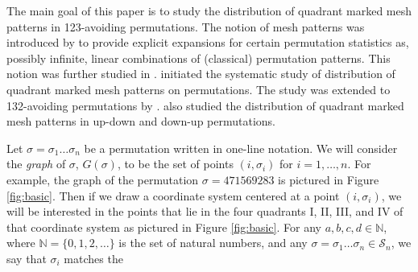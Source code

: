 \documentclass[
final,nomarks
]{dmtcs-episciences}
\newcommand{\Sn}[1]{\mathcal{S}_{#1}}
\begin{document}
The main goal of this paper is to study the distribution of 
quadrant marked mesh patterns in 123-avoiding permutations. 
The notion of mesh patterns was introduced by \cite{BrCl} to provide explicit expansions for certain permutation statistics as, possibly infinite, linear combinations of (classical) permutation patterns.  This notion was further studied in \cite{AKV,HilJonSigVid,kitlie,kitrem,Ulf}.  \cite{kitrem} initiated the systematic study of distribution of quadrant marked mesh patterns on permutations. The study was extended to 132-avoiding permutations by \cite{KRT1,KRT2,KRT3}.  \cite{kitrem2,kitrem3} also studied the distribution of quadrant marked 
mesh patterns in up-down and down-up permutations. 

Let \begin{math}\sigma = \sigma_1 \ldots \sigma_n\end{math} be a permutation written in one-line notation. We will consider the 
\emph{graph} of \begin{math}\sigma\end{math}, \begin{math}G(\sigma)\end{math}, to be the set of points \begin{math}(i,\sigma_i)\end{math} for 
\begin{math}i =1, \ldots, n\end{math}.  For example, the graph of the permutation 
\begin{math}\sigma = 471569283\end{math} is pictured in Figure 
\ref{fig:basic}.  Then if we draw a coordinate system centered at a 
point \begin{math}(i,\sigma_i)\end{math}, we will be interested in  the points that 
lie in the four quadrants I, II, III, and IV of that 
coordinate system as pictured 
in Figure \ref{fig:basic}.  For any \begin{math}a,b,c,d \in  
\mathbb{N}\end{math}, where \begin{math}\mathbb{N} = \{0,1,2, \ldots \}\end{math} is the set of 
natural numbers, and any \begin{math}\sigma = \sigma_1 \ldots \sigma_n \in \Sn{n}\end{math}, 
we say that \begin{math}\sigma_i\end{math} matches the 
\end{document}
